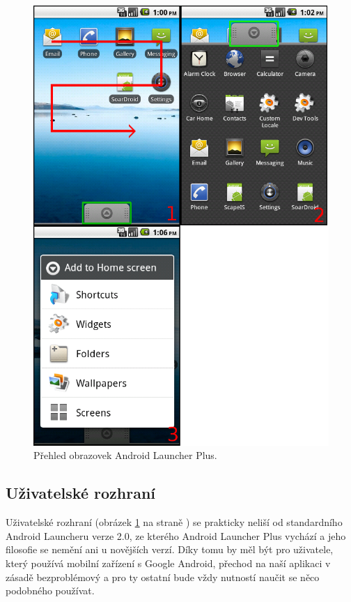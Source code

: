 \documentclass[thesis=M,czech]{FITthesis}[2012/06/26]
\begin{document}
\begin{figure}\centering
	\includegraphics[width=1\textwidth]{figures/launcher_screens}
	\caption{Přehled obrazovek Android Launcher Plus.}
	\label{fig:launcher_screens}
\end{figure}

\subsection{Uživatelské rozhraní}
Uživatelské rozhraní (obrázek \ref{fig:launcher_screens} na straně \pageref{fig:launcher_screens}) se prakticky neliší od standardního Android Launcheru verze 2.0, ze kterého Android Launcher Plus vychází a jeho filosofie se nemění ani u novějších verzí. Díky tomu by měl být pro uživatele, který používá mobilní zařízení s Google Android, přechod na naší aplikaci v zásadě bezproblémový a pro ty ostatní bude vždy nutností naučit se něco podobného používat.
\end{document}
